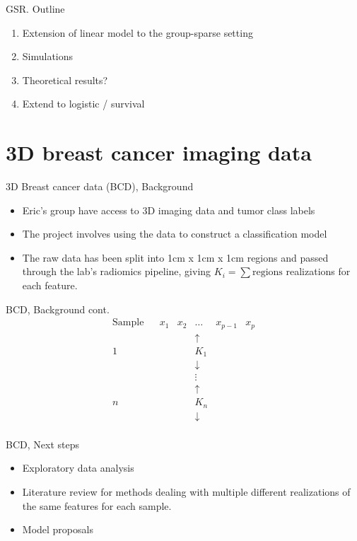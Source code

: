 \documentclass{beamer}
\begin{document}
\begin{frame}{GSR. Outline}
\begin{enumerate}
    \itemsep1em
    \item Extension of linear model to the group-sparse setting
    \item Simulations
    \item Theoretical results?
    \item Extend to logistic / survival
\end{enumerate}
\end{frame}


\section{3D breast cancer imaging data}
\begin{frame}{3D Breast cancer data (BCD), Background}
\begin{itemize}
    \itemsep0.8em
    \item Eric's group have access to 3D imaging data and tumor class labels
    \item The project involves using the data to construct a classification model
    \item The raw  data has been split into 1cm x 1cm x 1cm regions and passed through the lab's radiomics pipeline, giving $K_i = \sum \text{regions}$ realizations for each feature.
\end{itemize}
\end{frame}

\begin{frame}{BCD, Background cont.}
\begin{equation*}
\begin{matrix}
    \text{Sample} & & x_1 & x_2 & \dots & x_{p-1} & x_p \\
		  &&&& \uparrow & \\
    1 		  &&&& K_1 & \\
      		  &&&& \downarrow & \\
		  &&&& \vdots \\
		  &&&& \uparrow & \\
    n 		  &&&& K_n & \\
      		  &&&& \downarrow & \\
\end{matrix}
\end{equation*}
\end{frame}

\begin{frame}{BCD, Next steps}
\begin{itemize}
    \itemsep1em
    \item Exploratory data analysis
    \item Literature review for methods dealing with multiple different realizations of the same features for each sample. 
    \item Model proposals
\end{itemize}
\end{frame}
\end{document}
